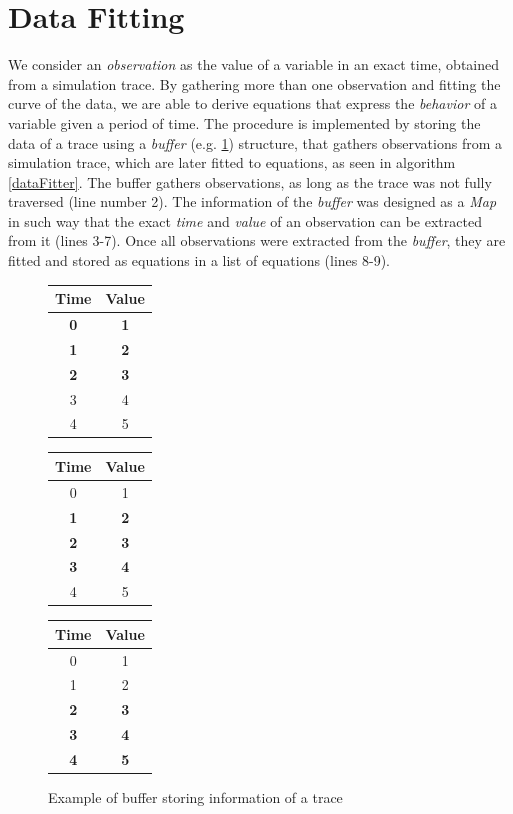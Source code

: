 \section{Data Fitting}
We consider an \textit{observation} as the value of a variable in an exact time, obtained from a simulation trace.
%
By gathering more than one observation and fitting the curve of the data, we are able to derive equations that express the  \textit{behavior} of a variable given a period of time. 
%
The procedure is implemented by storing the data of a trace using a \textit{buffer} (e.g. \ref{buffer_slide}) structure, that gathers observations from a simulation trace, which are later fitted to equations, as seen in algorithm \ref{dataFitter}. The buffer gathers observations, as long as the trace was not fully traversed (line number 2). The information of the \textit{buffer} was designed as a \textit{Map} in such way that the exact \textit{time} and \textit{value} of an observation can be extracted from it (lines 3-7). Once all observations were extracted from the \textit{buffer}, they are fitted and stored as equations in a list of equations (lines 8-9).
%
 
%
\begin{figure}[h]
\begin{center}
		\begin{tabular}{||c c ||}
		\hline
		Time & Value  \\ [0.5ex] 
		\hline\hline
		\textbf{0} & \textbf{1} \\ 
		\hline
		\textbf{1} & \textbf{2} \\
		\hline
		\textbf{2} & \textbf{3} \\
		\hline
		3 & 4 \\
		\hline
		4 & 5  \\ [1ex] 
		\hline
	\end{tabular}
	\begin{tabular}{||c c ||}
		\hline
		Time & Value  \\ [0.5ex] 
		\hline\hline
		 0 & 1 \\ 
		\hline
		\textbf{1} & \textbf{2} \\
		\hline
		\textbf{2} & \textbf{3} \\
		\hline
		\textbf{3} & \textbf{4} \\
		\hline
		4 & 5  \\ [1ex] 
		\hline
	\end{tabular}
	\begin{tabular}{||c c ||}
		\hline
		Time & Value  \\ [0.5ex] 
		\hline\hline
		0 & 1 \\ 
		\hline
		1 & 2 \\
		\hline
		\textbf{2} & \textbf{3} \\
		\hline
		\textbf{3} & \textbf{4} \\
		\hline
		\textbf{4} & \textbf{5}  \\ [1ex] 
		\hline
	\end{tabular}
\end{center}
\caption{Example of buffer storing information of a trace}
\label{buffer_slide}
\end{figure}

